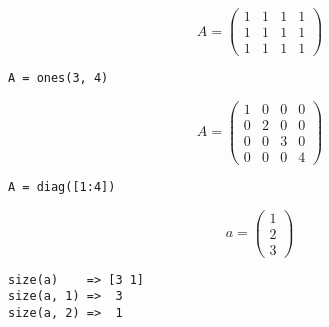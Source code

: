 \documentclass
[
  fontsize = 11pt,
  parskip  = half-,
  BCOR     = 0pt,
  DIV      = 11,
  ngerman
]
{scrartcl}
\begin{document}
\begin{minipage}{\mw}
  \begin{equation*}
    A=\begin{pmatrix}
        1 & 1 & 1 & 1 \\
        1 & 1 & 1 & 1 \\
        1 & 1 & 1 & 1
      \end{pmatrix}
  \end{equation*}
\end{minipage}%
\hfill
\begin{minipage}{\cw}
\begin{verbatim}
A = ones(3, 4)
\end{verbatim}
\end{minipage}\bigskip

\begin{minipage}{\mw}
  \begin{equation*}
    A=\begin{pmatrix}
        1 & 0 & 0 & 0 \\
        0 & 2 & 0 & 0 \\
        0 & 0 & 3 & 0 \\
        0 & 0 & 0 & 4
      \end{pmatrix}
  \end{equation*}
\end{minipage}%
\hfill
\begin{minipage}{\cw}
\begin{verbatim}
A = diag([1:4])
\end{verbatim}
\end{minipage}\bigskip

\begin{minipage}{\mw}
  \begin{equation*}
    a=\begin{pmatrix}
        1 \\ 2 \\ 3
      \end{pmatrix}
  \end{equation*}
\end{minipage}%
\hfill
\begin{minipage}{\cw}
\begin{verbatim}
size(a)    => [3 1]
size(a, 1) =>  3
size(a, 2) =>  1
\end{verbatim}
\end{minipage}
\end{document}
